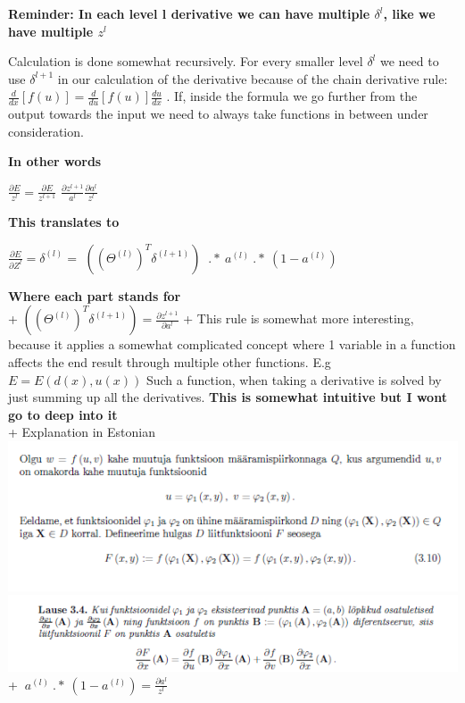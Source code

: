 \textbf{Reminder: In each level l derivative we can have multiple
\(\delta^{l}\), like we have multiple \(z^{l}\)}

Calculation is done somewhat recursively. For every smaller level
\(\delta^{l}\) we need to use \(\delta^{l+1}\) in our calculation of the
derivative because of the chain derivative rule:
\(\frac{d}{{dx}}\left[ {f\left( u \right)} \right] = \frac{d}{{du}}\left[ {f\left( u \right)} \right]\frac{{du}}{{dx}}\)
. If, inside the formula we go further from the output towards the input
we need to always take functions in between under consideration.

\textbf{In other words}

\(\frac{\partial E}{z^{l}}=\frac{\partial E}{z^{l+1}}\)
\textbf{\(\frac{\partial z^{l+1}}{ a^{l}} \frac{\partial a^{l}}{z^{l}}\)}

\textbf{This translates to}

\(\frac{\partial E}{\partial Z^{l}} = \delta^{(l)} =\)
\(((\Theta^{(l)})^T \delta^{(l+1)})\)
\(\ .* \ a^{(l)}\ .* \ (1 - a^{(l)})\)

\textbf{Where each part stands for}\\
+
\(((\Theta^{(l)})^T \delta^{(l+1)})=\frac{\partial z^{l+1}}{\partial a^{l}}\)
+ This rule is somewhat more interesting, because it applies a somewhat
complicated concept where 1 variable in a function affects the end
result through multiple other functions. E.g \(E=E(d(x),u(x))\) Such a
function, when taking a derivative is solved by just summing up all the
derivatives. \textbf{This is somewhat intuitive but I wont go to deep
into it}\\
+ Explanation in Estonian\\
\includegraphics{matAnal1.png}\\
\includegraphics{matAnal2.png} +
\(\ a^{(l)}\ .* \ (1 - a^{(l)}) = \frac{\partial a^{l}}{z^{l}}\)

